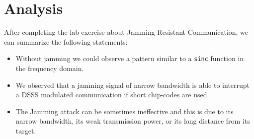 \documentclass[12pt,a4paper]{article}
\begin{document}
\section{Analysis}
After completing the lab exercise about Jamming Resistant Communication, we can summarize the following statements:
\begin{itemize}
\item Without jamming we could observe a pattern similar to a \texttt{sinc} function in the frequency domain.
\item We observed that a jamming signal of narrow bandwidth is able to interrupt a DSSS modulated communication if short chip-codes are used. 
\item The Jamming attack can be sometimes ineffective and this is due to its narrow bandwidth, its weak transmission power, or its long distance from its target. 

\end{itemize}



\end{document}
